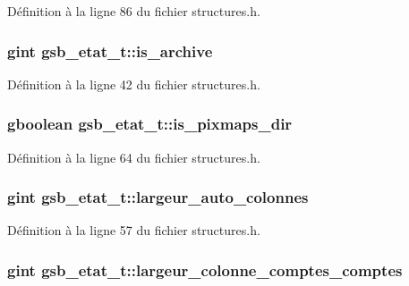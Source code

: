 Définition à la ligne 86 du fichier structures.h.

\subsubsection[{is\_\-archive}]{\setlength{\rightskip}{0pt plus 5cm}gint {\bf gsb\_\-etat\_\-t::is\_\-archive}}\label{structgsb__etat__t_ac9abb0586d6d0af26cfd09e1b99057d8}


Définition à la ligne 42 du fichier structures.h.

\subsubsection[{is\_\-pixmaps\_\-dir}]{\setlength{\rightskip}{0pt plus 5cm}gboolean {\bf gsb\_\-etat\_\-t::is\_\-pixmaps\_\-dir}}\label{structgsb__etat__t_abfc8db076ca582b5323f585f21698ca8}


Définition à la ligne 64 du fichier structures.h.

\subsubsection[{largeur\_\-auto\_\-colonnes}]{\setlength{\rightskip}{0pt plus 5cm}gint {\bf gsb\_\-etat\_\-t::largeur\_\-auto\_\-colonnes}}\label{structgsb__etat__t_a352f15e3c36e2018ce3a749d693dd996}


Définition à la ligne 57 du fichier structures.h.

\subsubsection[{largeur\_\-colonne\_\-comptes\_\-comptes}]{\setlength{\rightskip}{0pt plus 5cm}gint {\bf gsb\_\-etat\_\-t::largeur\_\-colonne\_\-comptes\_\-comptes}}\label{structgsb__etat__t_a98930857c3bbd64e9d392bd3f670dcba}


